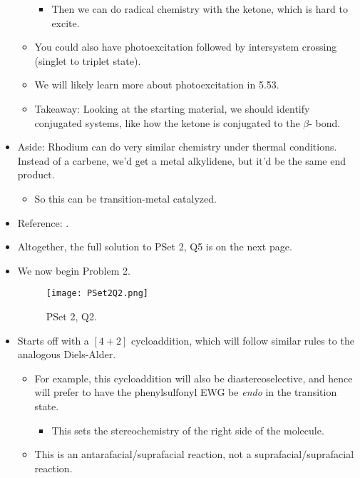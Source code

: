 \documentclass[../notes.tex]{subfiles}
\begin{document}
\begin{itemize}
\begin{itemize}
\begin{itemize}
\begin{itemize}
            \end{itemize}
            \item Then we can do radical chemistry with the ketone, which is hard to excite.
        \end{itemize}
        \item You could also have photoexcitation followed by intersystem crossing (singlet to triplet state).
        \item We will likely learn more about photoexcitation in 5.53.
        \item Takeaway: Looking at the starting material, we should identify conjugated systems, like how the ketone is conjugated to the $\beta$- bond.
    \end{itemize}
    \item Aside: Rhodium can do very similar chemistry under thermal conditions. Instead of a carbene, we'd get a metal alkylidene, but it'd be the same end product.
    \begin{itemize}
        \item So this can be transition-metal catalyzed.
    \end{itemize}
    \item Reference: \textcite{bib:PSet2Q5}.
    \item Altogether, the full solution to PSet 2, Q5 is on the next page.
    
    \item We now begin Problem 2.
    \begin{figure}[h!]
        \centering
        \texttt{[image: PSet2Q2.png]}
        \caption{PSet 2, Q2.}
        \label{fig:PSet2Q2}
    \end{figure}
    \item Starts off with a $[4+2]$ cycloaddition, which will follow similar rules to the analogous Diels-Alder.
    \begin{itemize}
        \item For example, this cycloaddition will also be diastereoselective, and hence will prefer to have the phenylsulfonyl EWG be \emph{endo} in the transition state.
        \begin{itemize}
            \item This sets the stereochemistry of the right side of the molecule.
        \end{itemize}
        \item This is an antarafacial/suprafacial reaction, not a suprafacial/suprafacial reaction.
        \begin{itemize}

\end{itemize}
\end{itemize}
\end{itemize}
\end{document}
